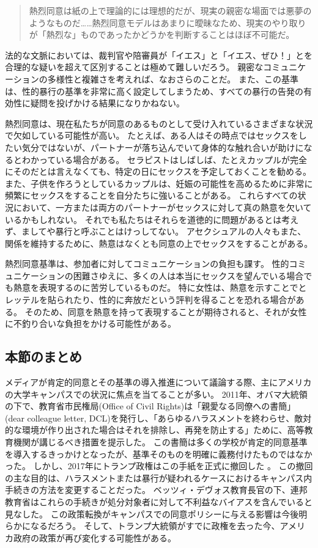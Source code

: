 \documentclass[paper=a4,book,openany]{jlreq}
\newcommand{\ig}[1]{}           %
\begin{document}
\begin{quote}
熱烈同意は紙の上で理論的には理想的だが、現実の親密な場面では悪夢のようなものだ……熱烈同意モデルはあまりに曖昧なため、現実のやり取りが「熱烈な」ものであったかどうかを判断することはほぼ不可能だ。
\citep{zheng14:_how_ace_sex}

\end{quote}

法的な文脈においては、裁判官や陪審員が「イエス」と「イエス、ぜひ！」とを合理的な疑いを超えて区別することは極めて難しいだろう。
親密なコミュニケーションの多様性と複雑さを考えれば、なおさらのことだ。
また、この基準は、性的暴行の基準を非常に高く設定してしまうため、すべての暴行の告発の有効性に疑問を投げかける結果になりかねない。

熱烈同意は、現在私たちが同意のあるものとして受け入れているさまざまな状況で欠如している可能性が高い。
たとえば、ある人はその時点ではセックスをしたい気分ではないが、パートナーが落ち込んでいて身体的な触れ合いが助けになるとわかっている場合がある。
セラピストはしばしば、たとえカップルが完全にそのだとは言えなくても、特定の日にセックスを予定しておくことを勧める。
また、子供を作ろうとしているカップルは、妊娠の可能性を高めるために非常に頻繁にセックスをすることを自分たちに強いることがある。
これらすべての状況において、一方または両方のパートナーがセックスに対して真の熱意を欠いているかもしれない。
それでも私たちはそれらを道徳的に問題があるとは考えず、ましてや暴行と呼ぶことはけっしてない。
アセクシュアルの人々もまた、関係を維持するために、熱意はなくとも同意の上でセックスをすることがある。

熱烈同意基準は、参加者に対してコミュニケーションの負担も課す。
性的コミュニケーションの困難さゆえに、多くの人は本当にセックスを望んでいる場合でも熱意を表現するのに苦労しているものだ。
特に女性は、熱意を示すことでとレッテルを貼られたり、性的に奔放だという評判を得ることを恐れる場合がある。
そのため、同意を熱意を持って表現することが期待されると、それが女性に不釣り合いな負担をかける可能性がある。

\subsection{本節のまとめ}

メディアが肯定的同意とその基準の導入推進について議論する際、主にアメリカの大学キャンパスでの状況に焦点を当てることが多い。
2011年、オバマ大統領の下で、教育省市民権局(Office of Civil Rights)は「親愛なる同僚への書簡」(dear colleague letter, DCL)を発行し、「あらゆるハラスメントを終わらせ、敵対的な環境が作り出された場合はそれを排除し、再発を防止する」ために、高等教育機関が講じるべき措置を提示した。
この書簡は多くの学校が肯定的同意基準を導入するきっかけとなったが、基準そのものを明確に義務付けたものではなかった。
しかし、2017年にトランプ政権はこの手紙を正式に撤回した
\citep{melnick20:_analy_depar_educat_final_title}。
この撤回の主な目的は、ハラスメントまたは暴行が疑われるケースにおけるキャンパス内手続きの方法を変更することだった。
ベッツィ・デヴォス\ig{Betsy DeVos}教育長官の下、連邦教育省はこれらの手続きが処分対象者に対して不利益なバイアスを含んでいると見なした。
この政策転換がキャンパスでの同意ポリシーに与える影響は今後明らかになるだろう。
そして、トランプ大統領がすでに政権を去った今、アメリカ政府の政策が再び変化する可能性がある。
\end{document}
